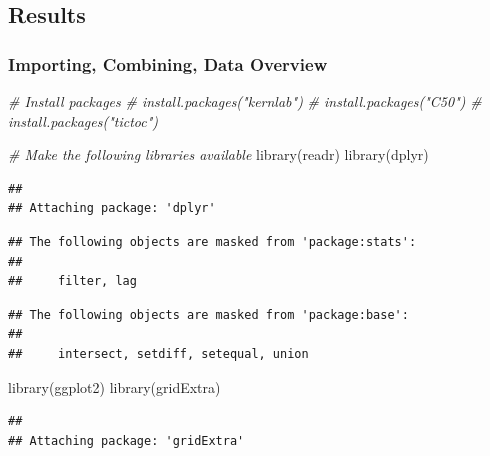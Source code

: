 \documentclass[
]{article}
\newenvironment{Shaded}{\begin{snugshade}}{\end{snugshade}}
\newcommand{\CommentTok}[1]{\textcolor[rgb]{0.56,0.35,0.01}{\textit{#1}}}
\newcommand{\FunctionTok}[1]{\textcolor[rgb]{0.00,0.00,0.00}{#1}}
\newcommand{\NormalTok}[1]{#1}
\newcommand{\StringTok}[1]{\textcolor[rgb]{0.31,0.60,0.02}{#1}}
\begin{document}
\hypertarget{results}{%
\subsection{\texorpdfstring{\textbf{Results}}{Results}}\label{results}}

\hypertarget{importing-combining-data-overview}{%
\subsubsection{\texorpdfstring{\textbf{Importing, Combining, Data
Overview}}{Importing, Combining, Data Overview}}\label{importing-combining-data-overview}}

\begin{Shaded}
\begin{Highlighting}[]
\CommentTok{\# Install packages}
\CommentTok{\# install.packages("kernlab")}
\CommentTok{\# install.packages("C50")}
\CommentTok{\# install.packages("tictoc")}

\CommentTok{\# Make the following libraries available}
\FunctionTok{library}\NormalTok{(}\StringTok{\textquotesingle{}readr\textquotesingle{}}\NormalTok{) }
\FunctionTok{library}\NormalTok{(}\StringTok{\textquotesingle{}dplyr\textquotesingle{}}\NormalTok{) }
\end{Highlighting}
\end{Shaded}

\begin{verbatim}
## 
## Attaching package: 'dplyr'
\end{verbatim}

\begin{verbatim}
## The following objects are masked from 'package:stats':
## 
##     filter, lag
\end{verbatim}

\begin{verbatim}
## The following objects are masked from 'package:base':
## 
##     intersect, setdiff, setequal, union
\end{verbatim}

\begin{Shaded}
\begin{Highlighting}[]
\FunctionTok{library}\NormalTok{(}\StringTok{\textquotesingle{}ggplot2\textquotesingle{}}\NormalTok{) }
\FunctionTok{library}\NormalTok{(}\StringTok{\textquotesingle{}gridExtra\textquotesingle{}}\NormalTok{)}
\end{Highlighting}
\end{Shaded}

\begin{verbatim}
## 
## Attaching package: 'gridExtra'
\end{verbatim}
\end{document}
